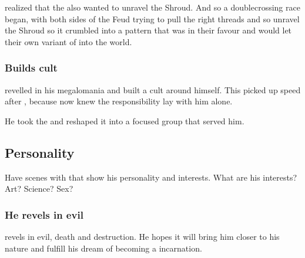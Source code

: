 \Vizsherioch{} realized that the \banelords{} also wanted to unravel the Shroud. 
And so a doublecrossing race began, with both sides of the Feud trying to pull the right threads and so unravel the Shroud so it crumbled into a pattern that was in their favour and would let their own variant of  into the world. 





\subsubsection{Builds cult}

\Vizsherioch revelled in his megalomania and built a cult around himself.
This picked up speed after , because \Vizsherioch now knew the responsibility lay with him alone.

He took the  and reshaped it into a focused group that served him. 










\subsection{Personality}
Have scenes with \Vizsherioch{} that show his personality and interests. What are his interests? Art? Science? Sex?




\subsubsection{He revels in evil}
\Vizsherioch{} revels in evil, death and destruction. 
He hopes it will bring him closer to his \xsic{} nature and fulfill his dream of becoming a \xs{} incarnation.






